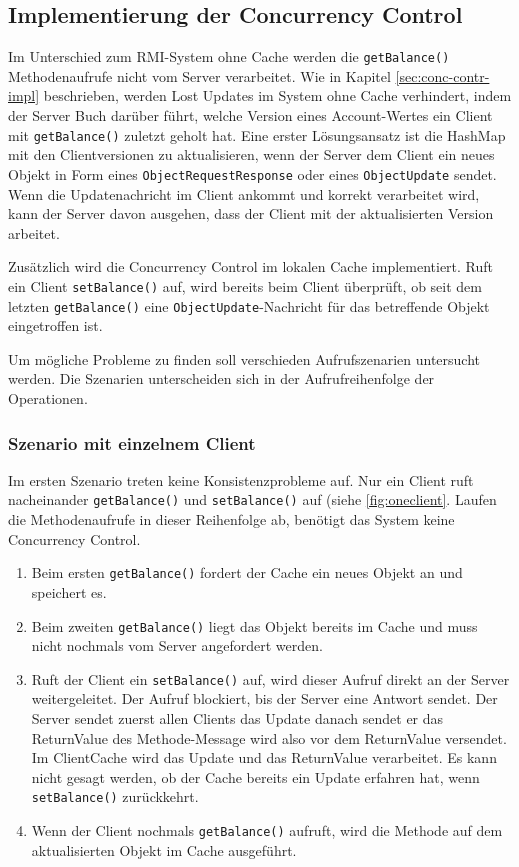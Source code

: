\subsection{Implementierung der Concurrency Control}
\label{sec:impl-der-conc}

Im Unterschied zum RMI-System ohne Cache werden die \texttt{getBalance()} Methodenaufrufe nicht vom Server verarbeitet. Wie in Kapitel \ref{sec:conc-contr-impl} beschrieben, werden Lost Updates im System ohne Cache verhindert, indem der Server Buch darüber führt, welche Version eines Account-Wertes ein Client mit \texttt{getBalance()} zuletzt geholt hat. Eine erster Lösungsansatz ist die HashMap mit den Clientversionen zu aktualisieren, wenn der Server dem Client ein neues Objekt in Form eines \texttt{ObjectRequestResponse} oder eines \texttt{ObjectUpdate} sendet. Wenn die Updatenachricht im Client ankommt und korrekt verarbeitet wird, kann der Server davon ausgehen, dass der Client mit der aktualisierten Version arbeitet.

Zusätzlich wird die Concurrency Control im lokalen Cache implementiert. Ruft ein Client \texttt{setBalance()} auf, wird bereits beim Client überprüft, ob seit dem letzten \texttt{getBalance()} eine \texttt{ObjectUpdate}-Nachricht für das betreffende Objekt eingetroffen ist. 

Um mögliche Probleme zu finden soll verschieden Aufrufszenarien untersucht werden. Die Szenarien unterscheiden sich in der Aufrufreihenfolge der Operationen.

\subsubsection{Szenario mit einzelnem Client}
\label{sec:mogl-aufr}

Im ersten Szenario treten keine Konsistenzprobleme auf. Nur ein Client ruft nacheinander \texttt{getBalance()} und \texttt{setBalance()} auf (siehe \ref{fig:oneclient}. Laufen die Methodenaufrufe in dieser Reihenfolge ab, benötigt das System keine Concurrency Control.

\begin{enumerate}
\item Beim ersten \verb|getBalance()| fordert der Cache ein neues Objekt an und speichert es.
\item Beim zweiten \verb|getBalance()|  liegt das Objekt bereits im Cache und muss nicht nochmals vom Server angefordert werden.
\item Ruft der Client ein \verb|setBalance()| auf, wird dieser Aufruf direkt an der Server weitergeleitet. Der Aufruf blockiert, bis der Server eine Antwort sendet. Der Server sendet zuerst allen Clients das Update danach sendet er das ReturnValue des Methode-Message wird also vor dem ReturnValue versendet. Im ClientCache wird das Update und das ReturnValue verarbeitet. Es kann nicht gesagt werden, ob der Cache bereits ein Update erfahren hat, wenn  \verb|setBalance()|  zurückkehrt.
\item Wenn der Client nochmals \texttt{getBalance()} aufruft, wird die Methode auf dem aktualisierten Objekt im Cache ausgeführt.
\end{enumerate}

